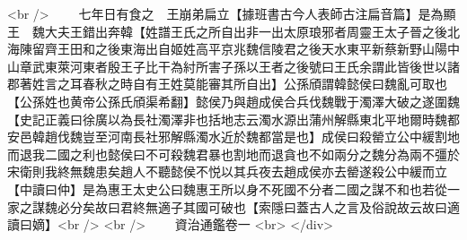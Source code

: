 <br />
　　七年日有食之　王崩弟扁立【據班書古今人表師古注扁音篇】是為顯王　魏大夫王錯出奔韓【姓譜王氏之所自出非一出太原琅邪者周靈王太子晉之後北海陳留齊王田和之後東海出自姬姓高平京兆魏信陵君之後天水東平新蔡新野山陽中山章武東萊河東者殷王子比干為紂所害子孫以王者之後號曰王氏余謂此皆後世以諸郡著姓言之耳春秋之時自有王姓莫能審其所自出】公孫頎謂韓懿侯曰魏亂可取也【公孫姓也黄帝公孫氏頎渠希翻】懿侯乃與趙成侯合兵伐魏戰于濁澤大破之遂圍魏【史記正義曰徐廣以為長社濁澤非也括地志云濁水源出蒲州解縣東北平地爾時魏都安邑韓趙伐魏豈至河南長社邪解縣濁水近於魏都當是也】成侯曰殺罃立公中緩割地而退我二國之利也懿侯曰不可殺魏君暴也割地而退貪也不如兩分之魏分為兩不彊於宋衛則我終無魏患矣趙人不聽懿侯不悦以其兵夜去趙成侯亦去罃遂殺公中緩而立【中讀曰仲】是為惠王太史公曰魏惠王所以身不死國不分者二國之謀不和也若從一家之謀魏必分矣故曰君終無適子其國可破也【索隱曰蓋古人之言及俗說故云故曰適讀曰嫡】<br />
<br />
　　資治通鑑卷一  <br>
   </div> 
